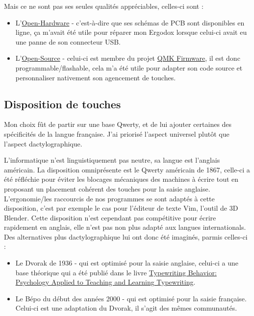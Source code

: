 \documentclass[a4paper,11pt]{article}
\begin{document}
\begin{blogmain}
Mais ce ne sont pas ses seules qualités appréciables, celles-ci sont :
\begin{itemize}
  \item L'\href{https://github.com/Ergodox-io/ErgoDox}{Open-Hardware} - c'est-à-dire que ses schémas de PCB sont disponibles en ligne, ça m'avait été utile pour réparer mon Ergodox lorsque celui-ci avait eu une panne de son connecteur USB.
  \item L'\href{https://github.com/qmk/qmk_firmware/blob/master/keyboards/ergodox_ez/readme.md}{Open-Source} - celui-ci est membre du projet \href{https://qmk.fm}{QMK Firmware}, il est donc programmable/flashable, cela m’a été utile pour adapter son code source et personnaliser nativement son agencement de touches.
\end{itemize}

\newpage

\subsection{Disposition de touches}
Mon choix fût de partir sur une base Qwerty, et de lui ajouter certaines des spécificités de la langue française.
J'ai priorisé l'aspect universel plutôt que l'aspect dactylographique.

\vspace{-80mm}

L'informatique n'est linguistiquement pas neutre, sa langue est l'anglais américain.
La disposition omniprésente est le Qwerty américain de 1867, celle-ci a été réfléchie pour éviter les blocages mécaniques des machines à écrire tout en proposant un placement cohérent des touches pour la saisie anglaise. 
L'ergonomie/les raccourcis de nos programmes se sont adaptés à cette disposition, c'est par exemple le cas pour l'éditeur de texte Vim, l'outil de 3D Blender.
Cette disposition n'est cependant pas compétitive pour écrire rapidement en anglais, elle n'est pas non plus adapté aux langues internationals.
Des alternatives plus dactylographique lui ont donc été imaginés, parmis celles-ci :
\begin{itemize}
  \item Le Dvorak de 1936 - qui est optimisé pour la saisie anglaise, celui-ci a une base théorique qui a été publié dans le livre \href{https://archive.org/details/in.ernet.dli.2015.74878}{Typewriting Behavior: Psychology Applied to Teaching and Learning Typewriting}.
  \item Le Bépo du début des années 2000 - qui est optimisé pour la saisie française. Celui-ci est une adaptation du Dvorak, il s'agit des mêmes communautés.
\end{itemize}


\end{blogmain}
\end{document}
